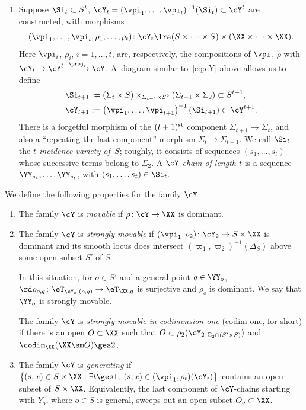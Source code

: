 \begin{m-definition}
\begin{aenum}
\begin{enumerate}
\item\label{d:YY-g-a3} Suppose $\Si_t\subset S^t$, $\cY_t=(\vpi_1,\dots,\vpi_t)^{-1}(\Si_t)\subset\cY^t$ are constructed, with morphisms 
\[
(\vpi_1,\dots,\vpi_t,\rho_1,\dots,\rho_t)\colon \cY_t\lra (S\times\dots\times S)\times (\XX\times\dots\times \XX).
\]
Here $\vpi_i$, $\rho_i$, $i=1,\dots, t$, are, respectively, the compositions of $\vpi$, $\rho$ with $\cY_t\to\cY^t\xrightarrow{\proj_i}\cY$. A~diagram similar to~\eqref{eq:cY} above allows us to define 
\begin{align*}
&\Si_{t+1}:=(\Sigma_t\times S)\times_{\Sigma_{t-1} \times S^{2}}\left(\Sigma_{t-1}\times\Sigma_2\right)\subset S^{t+1}, 
\\
&\cY_{t+1}:=\left(\vpi_1,\dots,\vpi_{t+1}\right)^{-1}\left(\Si_{t+1}\right)\subset\cY^{t+1}.
\end{align*}
There is a forgetful morphism of the $(t+1)^{\rm st}$ component $\Sigma_{t+1}\to\Sigma_{t}$, and also a ``repeating the last component'' morphism $\Sigma_t\to\Sigma_{t+1}$. We call $\Si_t$ the \emph{$t$-incidence variety of\, $S$}; roughly, it consists of sequences $(s_1,\dots,s_t)$ whose successive terms belong to $\Sigma_2$. A \emph{$\cY$-chain of length $t$} is a sequence $\YY_{s_1},\dots,\YY_{s_t}$, with $(s_1,\dots,s_t)\in\Si_t$. 
\end{enumerate}

\item \label{d:YY-g-b}
We define the following properties for the family $\cY$: 
\begin{enumerate}
\item\label{d:YY-g-b1} The family $\cY$ is \emph{movable} if $\rho\colon\cY\to \XX$ is dominant. 

\item\label{d:YY-g-b2} The family $\cY$ is \emph{strongly movable} if $(\vpi_1,\rho_2)\colon\cY_2\to S\times \XX$ is dominant and its smooth locus does intersect $(\varpi_1,\varpi_2)^{-1}(\Delta_S)$ above some open subset $S'$ of $S$. 

  In this situation, for $o\in S'$ and a general point $q\in\YY_o$, $\rd\rho_{o,q}\colon\eT_{\cY_o,(o,q)}\to\eT_{\XX,q}$ is surjective and $\rho_o$ is dominant. We say that $\YY_o$ is strongly movable. 

The family $\cY$ is \emph{strongly movable in codimension one} (codim-one, for short) if there is an open $O\subset\XX$  such that  
$O\subset\rho_2(\cY_2|_{\Sigma_2\cap (S'\times S)})$ and $\codim_\XX(\XX\sm O)\ges2$. 

\item\label{d:YY-g-b3} The family $\cY$ is \emph{generating} if $\big\{(s,x)\in S\times\XX\mid \exists t\ges 1,\;(s,x)\in(\vpi_1,\rho_t)(\cY_t)\big\}$ contains an open subset of $S\times\XX$. Equivalently, the last component of $\cY$-chains starting with $Y_o$, where $o\in S$ is general, sweeps out an open subset $O_o\subset\XX$.


\end{enumerate}
\end{aenum}
\end{m-definition}
